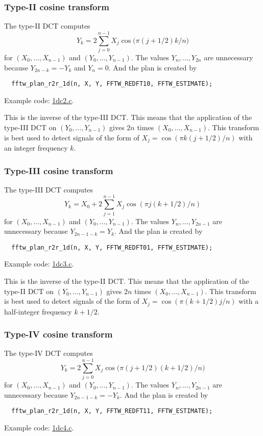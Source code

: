 \documentclass[12pt]{article}
\begin{document}
\subsubsection{Type-II cosine transform}
The type-II DCT computes
\begin{equation}
  Y_k = 2 \sum_{j = 0}^{n - 1} X_j \cos\big(  \pi (j + 1/2) k / n  \big)
\end{equation}
%
for $(X_0, \dots, X_{n-1})$ and $(Y_0, \dots, Y_{n-1})$.
%
The values $Y_{n}, \dots, Y_{2n}$ are unnecessary because
$Y_{2n - k} = -Y_k$
and
$Y_n = 0$.
%
And the plan is created by
\begin{verbatim}
  fftw_plan_r2r_1d(n, X, Y, FFTW_REDFT10, FFTW_ESTIMATE);
\end{verbatim}
Example code: \url{1dc2.c}.

This is the inverse of the type-III DCT.
%
This means that the application of the type-III DCT on $(Y_0, \dots, Y_{n-1})$
  gives $2n$ times $(X_0, \dots, X_{n - 1})$.
%
This transform is best used to detect signals of the form of
  $X_j = \cos(\pi k (j + 1/2)/n)$
  with an integer frequency $k$.





\subsubsection{Type-III cosine transform}
The type-III DCT computes
\begin{equation}
  Y_k = X_0 + 2 \sum_{j = 1}^{n - 1} X_j \cos(\pi j (k + 1/2) / n)
\end{equation}
%
for $(X_0, \dots, X_{n-1})$ and $(Y_0, \dots, Y_{n-1})$.
%
The values $Y_{n}, \dots, Y_{2n - 1}$ are unnecessary because
$Y_{2n - 1 - k} = Y_k$.
%
And the plan is created by
\begin{verbatim}
  fftw_plan_r2r_1d(n, X, Y, FFTW_REDFT01, FFTW_ESTIMATE);
\end{verbatim}
Example code: \url{1dc3.c}.

This is the inverse of the type-II DCT.
%
This means that the application of the type-II DCT on $(Y_0, \dots, Y_{n-1})$
  gives $2n$ times $(X_0, \dots, X_{n - 1})$.
%
This transform is best used to detect signals of the form of
  $X_j = \cos(\pi (k + 1/2) j/n)$
  with a half-integer frequency $k + 1/2$.





\subsubsection{Type-IV cosine transform}
The type-IV DCT computes
\begin{equation}
  Y_k = 2 \sum_{j = 0}^{n - 1} X_j \cos\big( \pi (j + 1/2) (k + 1/2) / n \big)
\end{equation}
%
for $(X_0, \dots, X_{n-1})$ and $(Y_0, \dots, Y_{n-1})$.
%
The values $Y_{n}, \dots, Y_{2n - 1}$ are unnecessary because
$Y_{2n - 1 - k} = -Y_k$.
%
And the plan is created by
\begin{verbatim}
  fftw_plan_r2r_1d(n, X, Y, FFTW_REDFT11, FFTW_ESTIMATE);
\end{verbatim}
Example code: \url{1dc4.c}.
\end{document}
